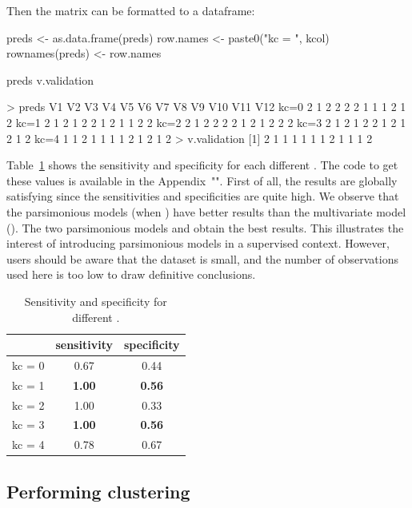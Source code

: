 Then the  matrix can be formatted to a dataframe:

\begin{example}
preds <- as.data.frame(preds)
row.names <- paste0("kc = ", kcol)
rownames(preds) <- row.names

preds
v.validation
\end{example}
\begin{example}
> preds
     V1 V2 V3 V4 V5 V6 V7 V8 V9 V10 V11 V12
kc=0  2  1  2  2  2  2  1  1  1   2   1   2
kc=1  2  1  2  1  2  2  1  2  1   1   2   2
kc=2  2  1  2  2  2  2  1  2  1   2   2   2
kc=3  2  1  2  1  2  2  1  2  1   2   1   2
kc=4  1  1  2  1  1  1  1  2  1   2   1   2
> v.validation
 [1] 2 1 1 1 1 1 1 2 1 1 1 2
\end{example}

Table~\ref{table:prs} shows the sensitivity and specificity for each different . The code to get these values is available in the Appendix~"". First of all, the results are globally satisfying since the sensitivities and specificities are quite high. We observe that the parsimonious models (when ) have better results than the multivariate model (). The two parsimonious models  and  obtain the best results. This illustrates the interest of introducing parsimonious models in a supervised context. However, users should be aware that the dataset is small, and the number of observations used here is too low to draw definitive conclusions.

\begin{table}[ht]
\centering
\caption{Sensitivity and specificity for different .}
\label{table:prs}
\begin{tabular}{ccc}
\toprule
& sensitivity  & specificity \\
\midrule
kc = 0 & 0.67 & 0.44   \\ 
\midrule
kc = 1 & \textbf{1.00} & \textbf{0.56} \\ 
\midrule
kc = 2 & 1.00 & 0.33 \\
\midrule
kc = 3 & \textbf{1.00} & \textbf{0.56} \\ 
\midrule
kc = 4 & 0.78 & 0.67 \\ 
\bottomrule
\end{tabular}
\end{table}

  
\subsection{Performing clustering}
\label{sec:appli-clust}

